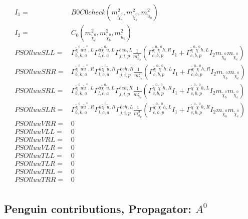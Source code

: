 \documentclass[A4,landscape]{article}
\begin{document}
\begin{align} 
I_1= & B0C0check(m^2_{\tilde{\chi}^0_{{c}}}, m^2_{\tilde{\chi}^0_{{b}}}, m^2_{\tilde{u}_{{a}}}) \\ 
I_2= & C_0(m^2_{\tilde{\chi}^0_{{c}}}, m^2_{\tilde{\chi}^0_{{b}}}, m^2_{\tilde{u}_{{a}}}) \\ 
  PSOlluuSLL= &  \Gamma^{\tilde{\chi}^0 u \tilde{u}^*,L}_{b, k, a} \Gamma^{\bar{u}\tilde{\chi}^0 \tilde{u} ,L}_{l, c, a} \Gamma^{\bar{e}e h ,L}_{j, i, p} \frac{1}{m^2_{h_{{p}}}} (\Gamma^{\tilde{\chi}^0 \tilde{\chi}^0 h ,R}_{c, b, p} I_1 + \Gamma^{\tilde{\chi}^0 \tilde{\chi}^0 h ,L}_{c, b, p} I_2 m_{\tilde{\chi}^0_{{b}}} m_{\tilde{\chi}^0_{{c}}}) \\ 
  PSOlluuSRR= &  \Gamma^{\tilde{\chi}^0 u \tilde{u}^*,R}_{b, k, a} \Gamma^{\bar{u}\tilde{\chi}^0 \tilde{u} ,R}_{l, c, a} \Gamma^{\bar{e}e h ,R}_{j, i, p} \frac{1}{m^2_{h_{{p}}}} (\Gamma^{\tilde{\chi}^0 \tilde{\chi}^0 h ,L}_{c, b, p} I_1 + \Gamma^{\tilde{\chi}^0 \tilde{\chi}^0 h ,R}_{c, b, p} I_2 m_{\tilde{\chi}^0_{{b}}} m_{\tilde{\chi}^0_{{c}}}) \\ 
  PSOlluuSRL= &  \Gamma^{\tilde{\chi}^0 u \tilde{u}^*,L}_{b, k, a} \Gamma^{\bar{u}\tilde{\chi}^0 \tilde{u} ,L}_{l, c, a} \Gamma^{\bar{e}e h ,R}_{j, i, p} \frac{1}{m^2_{h_{{p}}}} (\Gamma^{\tilde{\chi}^0 \tilde{\chi}^0 h ,R}_{c, b, p} I_1 + \Gamma^{\tilde{\chi}^0 \tilde{\chi}^0 h ,L}_{c, b, p} I_2 m_{\tilde{\chi}^0_{{b}}} m_{\tilde{\chi}^0_{{c}}}) \\ 
  PSOlluuSLR= &  \Gamma^{\tilde{\chi}^0 u \tilde{u}^*,R}_{b, k, a} \Gamma^{\bar{u}\tilde{\chi}^0 \tilde{u} ,R}_{l, c, a} \Gamma^{\bar{e}e h ,L}_{j, i, p} \frac{1}{m^2_{h_{{p}}}} (\Gamma^{\tilde{\chi}^0 \tilde{\chi}^0 h ,L}_{c, b, p} I_1 + \Gamma^{\tilde{\chi}^0 \tilde{\chi}^0 h ,R}_{c, b, p} I_2 m_{\tilde{\chi}^0_{{b}}} m_{\tilde{\chi}^0_{{c}}}) \\ 
  PSOlluuVRR= & 0 \\ 
  PSOlluuVLL= & 0 \\ 
  PSOlluuVRL= & 0 \\ 
  PSOlluuVLR= & 0 \\ 
  PSOlluuTLL= & 0 \\ 
  PSOlluuTLR= & 0 \\ 
  PSOlluuTRL= & 0 \\ 
  PSOlluuTRR= & 0 \\ 
\end{align} 
\subsection{Penguin contributions, Propagator: $A^0$} 
\end{document}
